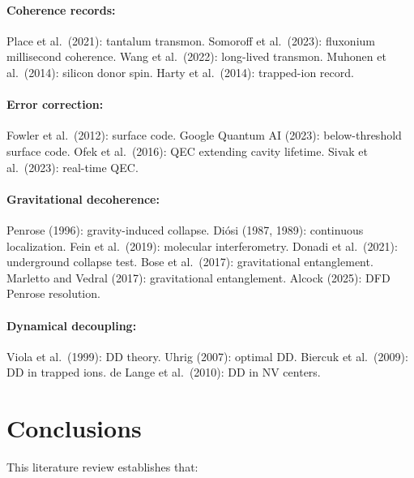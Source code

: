 \documentclass[11pt,letterpaper]{article}
\begin{document}
\paragraph{Coherence records:}
Place et al.\ (2021): tantalum transmon.
Somoroff et al.\ (2023): fluxonium millisecond coherence.
Wang et al.\ (2022): long-lived transmon.
Muhonen et al.\ (2014): silicon donor spin.
Harty et al.\ (2014): trapped-ion record.

\paragraph{Error correction:}
Fowler et al.\ (2012): surface code.
Google Quantum AI (2023): below-threshold surface code.
Ofek et al.\ (2016): QEC extending cavity lifetime.
Sivak et al.\ (2023): real-time QEC.

\paragraph{Gravitational decoherence:}
Penrose (1996): gravity-induced collapse.
Di\'osi (1987, 1989): continuous localization.
Fein et al.\ (2019): molecular interferometry.
Donadi et al.\ (2021): underground collapse test.
Bose et al.\ (2017): gravitational entanglement.
Marletto and Vedral (2017): gravitational entanglement.
Alcock (2025): DFD Penrose resolution.

\paragraph{Dynamical decoupling:}
Viola et al.\ (1999): DD theory.
Uhrig (2007): optimal DD.
Biercuk et al.\ (2009): DD in trapped ions.
de Lange et al.\ (2010): DD in NV centers.

\section{Conclusions}

This literature review establishes that:
\end{document}
